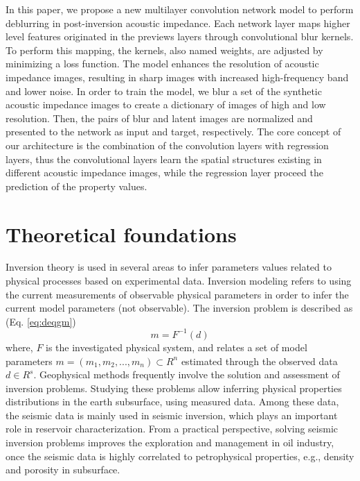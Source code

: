\documentclass[conference,compsoc]{IEEEtran}
\begin{document}
In this paper, we propose a new multilayer convolution network model to perform deblurring in post-inversion acoustic impedance.
Each network layer maps higher level features originated in the previews layers through convolutional blur kernels.
To perform this mapping, the kernels, also named weights, are adjusted by minimizing a loss function. 
The model enhances the resolution of acoustic impedance images, resulting in sharp images with
increased high-frequency band and lower noise. 
In order to train the model, we blur a set of the synthetic acoustic impedance images to create a dictionary of
images of high and low resolution. Then, the pairs of blur and latent images are normalized and 
presented to the network as input and target, respectively.
The core concept of our architecture is the combination of the convolution layers with regression
layers, thus the convolutional layers learn the spatial structures existing in different
acoustic impedance images, while the regression layer proceed the prediction of the property values.
 

\section{Theoretical foundations}
Inversion theory is used in several areas to infer parameters values
related to physical processes based on experimental data.
Inversion modeling refers to using the current measurements of observable
physical parameters in order to infer the current model parameters (not observable).
The inversion problem is described as (Eq. \ref{eq:deqgm})
\begin{equation}
\label{eq:deqgm}
m = F^{-1}(d)
\end{equation}
where, $F$ is the investigated physical system, and relates a set of model parameters
$m=(m_1, m_2,...,m_n)\subset R^n$ estimated through the observed data $d \in R^s$.
Geophysical methods frequently involve the solution and assessment of inversion problems.
Studying these problems allow inferring physical properties distributions in the earth subsurface, using measured
data. Among these data, the seismic data is mainly used in seismic inversion, which plays an important role in
reservoir characterization. From a practical perspective, solving seismic inversion problems improves
the exploration and management in oil industry, once the seismic data is highly correlated to petrophysical
properties, e.g., density and porosity in subsurface.
\end{document}
